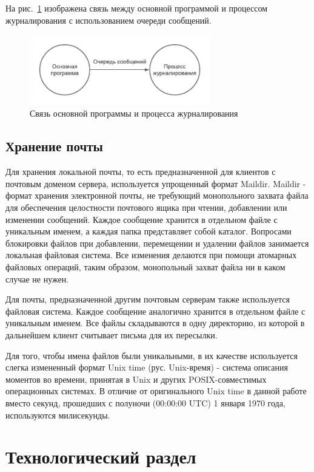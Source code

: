 \documentclass[a4paper,12pt]{report}
\begin{document}
На рис.~\ref{fig:ipc} изображена связь между основной программой и процессом журналирования с использованием очереди сообщений.

\begin{figure}[h]
    \centering
    \includegraphics[width=0.7\textwidth]{pics/ipc.pdf}
    \caption{Связь основной программы и процесса журналирования}
    \label{fig:ipc}
\end{figure}


\section{Хранение почты}

Для хранения локальной почты, то есть предназначенной для клиентов с почтовым доменом сервера, используется упрощенный формат Maildir. Maildir - формат хранения электронной почты, не требующий монопольного захвата файла для обеспечения целостности почтового ящика при чтении, добавлении или изменении сообщений. Каждое сообщение хранится в отдельном файле с уникальным именем, а каждая папка представляет собой каталог. Вопросами блокировки файлов при добавлении, перемещении и удалении файлов занимается локальная файловая система. Все изменения делаются при помощи атомарных файловых операций, таким образом, монопольный захват файла ни в каком случае не нужен.

Для почты, предназначенной другим почтовым серверам также используется файловая система. Каждое сообщение аналогично хранится в отдельном файле с уникальным именем. Все файлы складываются в одну директорию, из которой в дальнейшем клиент считывает письма для их пересылки. 

Для того, чтобы имена файлов были уникальными, в их качестве используется слегка измененный формат Unix time (рус. Unix-время) - система описания моментов во времени, принятая в Unix и других POSIX-совместимых операционных системах. В отличие от оригинального Unix time в данной работе вместо секунд, прошедших с полуночи (00:00:00 UTC) 1 января 1970 года, используются милисекунды.


\chapter{Технологический раздел}
\end{document}
